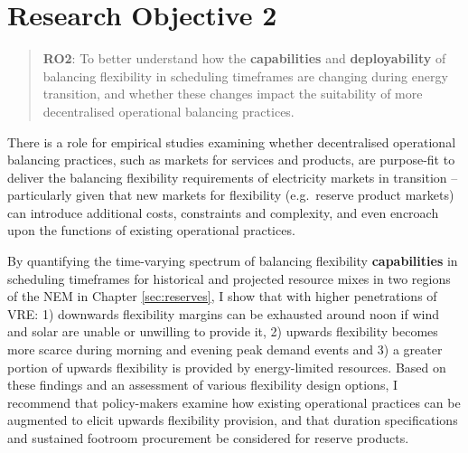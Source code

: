 \documentclass[12pt,a4paper,]{report}
\begin{document}
\hypertarget{sec:conclusion-ro2}{%
\section{Research Objective 2}\label{sec:conclusion-ro2}}

\begin{quote}
\textbf{RO2}: To better understand how the \textbf{capabilities} and
\textbf{deployability} of balancing flexibility in scheduling timeframes
are changing during energy transition, and whether these changes impact
the suitability of more decentralised operational balancing practices.
\end{quote}

There is a role for empirical studies examining whether decentralised
operational balancing practices, such as markets for services and
products, are purpose-fit to deliver the balancing flexibility
requirements of electricity markets in transition -- particularly given
that new markets for flexibility (e.g.~reserve product markets) can
introduce additional costs, constraints and complexity, and even
encroach upon the functions of existing operational practices.

By quantifying the time-varying spectrum of balancing flexibility
\textbf{capabilities} in scheduling timeframes for historical and
projected resource mixes in two regions of the NEM in Chapter
\ref{sec:reserves}, I show that with higher penetrations of VRE: 1)
downwards flexibility margins can be exhausted around noon if wind and
solar are unable or unwilling to provide it, 2) upwards flexibility
becomes more scarce during morning and evening peak demand events and 3)
a greater portion of upwards flexibility is provided by energy-limited
resources. Based on these findings and an assessment of various
flexibility design options, I recommend that policy-makers examine how
existing operational practices can be augmented to elicit upwards
flexibility provision, and that duration specifications and sustained
footroom procurement be considered for reserve products.
\end{document}
